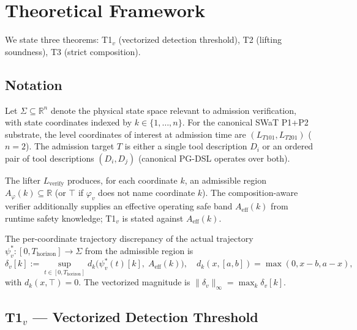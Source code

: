 \section{Theoretical Framework}
\label{sec:theory}

We state three theorems: T1${}_v$ (vectorized detection threshold),
T2 (lifting soundness), T3 (strict composition).

\subsection{Notation}

Let $\Sigma \subseteq \mathbb{R}^n$ denote the physical state space
relevant to admission verification, with state coordinates indexed by
$k \in \{1, \dots, n\}$. For the canonical SWaT P1+P2 substrate, the
level coordinates of interest at admission time are $(L_{T101},
L_{T201})$ ($n=2$). The admission target $T$ is either a single tool
description $D_i$ or an ordered pair of tool descriptions $(D_i, D_j)$
(canonical PG-DSL operates over both).

The lifter $L_{\text{verify}}$ produces, for each coordinate $k$, an
admissible region $A_\varphi(k) \subseteq \mathbb{R}$ (or $\top$ if
$\varphi_v$ does not name coordinate $k$). The composition-aware
verifier additionally supplies an effective operating safe band
$A_{\text{eff}}(k)$ from runtime safety knowledge; T1${}_v$ is stated
against $A_{\text{eff}}(k)$.

The per-coordinate trajectory discrepancy of the actual trajectory
$\psi_v^{*}: [0, T_{\text{horizon}}] \to \Sigma$ from the admissible
region is
\[
\delta_v[k] := \sup_{t \in [0, T_{\text{horizon}}]}
   d_k\!\bigl(\psi_v^{*}(t)[k],\; A_{\text{eff}}(k)\bigr),
\quad d_k(x, [a,b]) = \max(0, x-b, a-x),
\]
with $d_k(x, \top) = 0$. The vectorized magnitude is
$\|\delta_v\|_\infty = \max_k \delta_v[k]$.

\subsection{T1${}_v$ --- Vectorized Detection Threshold}

